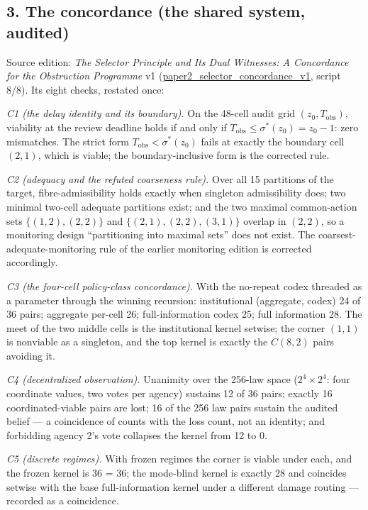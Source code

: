 \documentclass[10pt,twocolumn]{article}
\theoremstyle{definition}
\begin{document}
\subsection{3. The concordance (the shared system, audited)}\label{concordance}

Source edition: \emph{The Selector Principle and Its Dual Witnesses: A
Concordance for the Obstruction Programme} v1
(\url{paper2_selector_concordance_v1}, script 8/8). Its eight checks,
restated once:

\emph{C1 (the delay identity and its boundary).} On the 48-cell audit grid
\((z_0, T_{\mathrm{obs}})\), viability at the review deadline holds if and
only if \(T_{\mathrm{obs}} \le \sigma^{*}(z_0) = z_0 - 1\): zero mismatches.
The strict form \(T_{\mathrm{obs}} < \sigma^{*}(z_0)\) fails at exactly the
boundary cell \((2, 1)\), which is viable; the boundary-inclusive form is the
corrected rule.

\emph{C2 (adequacy and the refuted coarseness rule).} Over all 15 partitions
of the target, fibre-admissibility holds exactly when singleton admissibility
does; two minimal two-cell adequate partitions exist; and the two maximal
common-action sets \(\{(1,2),(2,2)\}\) and \(\{(2,1),(2,2),(3,1)\}\) overlap
in \((2,2)\), so a monitoring design ``partitioning into maximal sets'' does
not exist. The coarsest-adequate-monitoring rule of the earlier monitoring
edition is corrected accordingly.

\emph{C3 (the four-cell policy-class concordance).} With the no-repeat codex
threaded as a parameter through the winning recursion: institutional
(aggregate, codex) 24 of 36 pairs; aggregate per-cell 26; full-information
codex 25; full information 28. The meet of the two middle cells is the
institutional kernel setwise; the corner \((1,1)\) is nonviable as a
singleton, and the top kernel is exactly the \(C(8,2)\) pairs avoiding it.

\emph{C4 (decentralized observation).} Unanimity over the 256-law space
(\(2^4 \times 2^4\): four coordinate values, two votes per agency) sustains
12 of 36 pairs; exactly 16 coordinated-viable pairs are lost; 16 of the 256
law pairs sustain the audited belief --- a coincidence of counts with the
loss count, not an identity; and forbidding agency 2's vote collapses the
kernel from 12 to 0.

\emph{C5 (discrete regimes).} With frozen regimes the corner is viable under
each, and the frozen kernel is 36 = 36; the mode-blind kernel is exactly 28
and coincides setwise with the base full-information kernel under a different
damage routing --- recorded as a coincidence.
\end{document}
